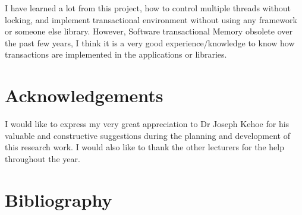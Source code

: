 \documentclass[12pt]{article}
\begin{document}
I have learned a lot from this project, how to control multiple threads without locking, and implement transactional environment without using any framework or someone else library. However, Software transactional Memory obsolete over the past few years, I think it is a very good experience/knowledge to know how transactions are implemented in the applications or libraries.

\section{Acknowledgements}
I would like to express my very great appreciation to Dr Joseph Kehoe for his valuable and constructive suggestions during the planning and development of this research work. I would also like to thank the other lecturers for the help throughout the year. 
        

\newpage
\section{Bibliography}
\begin{center}



\end{center}
\end{document}
